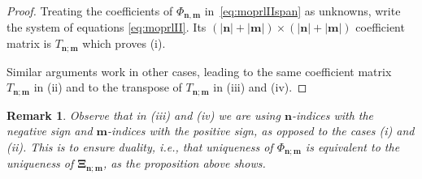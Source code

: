 \documentclass[reqno,centertags,11pt,draft]{amsart}
\newtheorem{rem}[thm]{Remark}
\newcommand{\abs}[1]{\left|#1\right|}
\begin{document}
\begin{proof}
    Treating the coefficients of $\Phi_{\bm{n},\bm{m}}$ in~\eqref{eq:moprlIIspan} as unknowns, write the system of equations \eqref{eq:moprlII}. Its $(\abs{\bm{n}}+\abs{\bm{m}}) \times (\abs{\bm{n}}+\abs{\bm{m}})$ coefficient matrix is $T_{\bm{n};\bm{m}}$ which proves (i). 

    Similar arguments work in other cases, leading to the same coefficient matrix $T_{\bm{n};\bm{m}}$ in (ii) and to the transpose of $T_{\bm{n};\bm{m}}$ in (iii)  and (iv).
\end{proof}
\begin{rem}
    Observe that in (iii) and (iv) we are using $\bm{n}$-indices with the negative sign and $\bm{m}$-indices with the positive sign, as opposed to the cases  (i) and (ii). This is to ensure duality, i.e., that uniqueness of $\Phi_{\bm{n};\bm{m}}$  is equivalent to the uniqueness of $\bm{\Xi}_{\bm{n};\bm{m}}$, as the proposition above shows. 
\end{rem}
\end{document}
